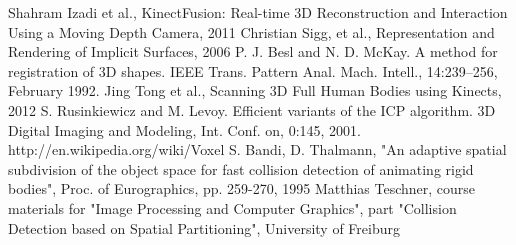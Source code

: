 \documentclass[12pt]{article}
\theoremstyle{plain}
\begin{document}
\begin{thebibliography}{widest entry}
   Shahram Izadi et al., KinectFusion: Real-time 3D
    Reconstruction and Interaction Using a Moving Depth Camera, 2011
   Christian Sigg, et
    al., Representation and Rendering of Implicit Surfaces, 2006
   P. J. Besl and N. D. McKay. A method for registration of 3D
    shapes. IEEE Trans. Pattern Anal. Mach. Intell., 14:239–256, February 1992. 
   Jing Tong et al., Scanning 3D Full Human Bodies using
    Kinects, 2012
   S. Rusinkiewicz and M. Levoy. Efficient variants of the
    ICP algorithm. 3D Digital Imaging and Modeling, Int.
    Conf. on, 0:145, 2001.
   http://en.wikipedia.org/wiki/Voxel
   S. Bandi, D. Thalmann, "An adaptive spatial
    subdivision of the object space for fast collision detection of animating
    rigid bodies", Proc. of Eurographics, pp. 259-270, 1995
   Matthias Teschner, course
    materials for "Image Processing and Computer Graphics", part "Collision
    Detection based on Spatial Partitioning", University of Freiburg 
\end{thebibliography}

\hfill\\
\end{document}
